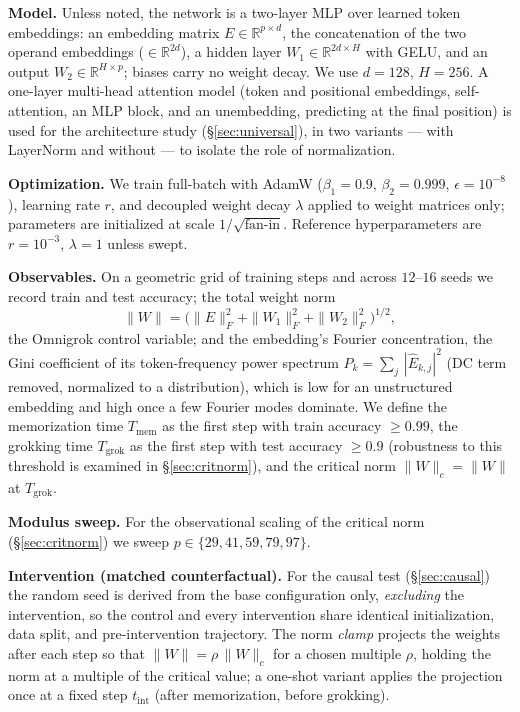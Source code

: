 \documentclass[10pt,twocolumn]{article}
\newcommand{\R}{\mathbb{R}}
\newcommand{\lam}{\lambda}
\newcommand{\Wc}{\|W\|_{c}}
\newcommand{\Tgrok}{T_{\mathrm{grok}}}
\begin{document}
\textbf{Model.} Unless noted, the network is a two-layer MLP over learned token embeddings: an embedding
matrix $E\in\R^{p\times d}$, the concatenation of the two operand embeddings ($\in\R^{2d}$), a hidden layer
$W_1\in\R^{2d\times H}$ with GELU, and an output $W_2\in\R^{H\times p}$; biases carry no weight decay. We
use $d=128$, $H=256$. A one-layer multi-head attention model (token and positional embeddings,
self-attention, an MLP block, and an unembedding, predicting at the final position) is used for the
architecture study (\S\ref{sec:universal}), in two variants --- with LayerNorm and without --- to isolate
the role of normalization.

\textbf{Optimization.} We train full-batch with AdamW ($\beta_1{=}0.9$, $\beta_2{=}0.999$,
$\epsilon{=}10^{-8}$), learning rate $r$, and decoupled weight decay $\lam$ applied to weight matrices only;
parameters are initialized at scale $1/\sqrt{\text{fan-in}}$. Reference hyperparameters are $r=10^{-3}$,
$\lam=1$ unless swept.

\textbf{Observables.} On a geometric grid of training steps and across $12$--$16$ seeds we record train and
test accuracy; the total weight norm
\begin{equation}
\|W\| = \big(\|E\|_F^2 + \|W_1\|_F^2 + \|W_2\|_F^2\big)^{1/2},
\end{equation}
the Omnigrok control variable; and the embedding's Fourier concentration, the Gini coefficient of its
token-frequency power spectrum $P_k=\sum_{j}\,|\hat{E}_{k,j}|^2$ (DC term removed, normalized to a
distribution), which is low for an unstructured embedding and high once a few Fourier modes dominate. We
define the memorization time $T_{\mathrm{mem}}$ as the first step with train accuracy $\ge 0.99$, the
grokking time $\Tgrok$ as the first step with test accuracy $\ge 0.9$ (robustness to this threshold is
examined in \S\ref{sec:critnorm}), and the critical norm $\Wc=\|W\|$ at $\Tgrok$.

\textbf{Modulus sweep.} For the observational scaling of the critical norm (\S\ref{sec:critnorm}) we sweep
$p\in\{29,41,59,79,97\}$.

\textbf{Intervention (matched counterfactual).} For the causal test (\S\ref{sec:causal}) the random seed is
derived from the base configuration only, \emph{excluding} the intervention, so the control and every
intervention share identical initialization, data split, and pre-intervention trajectory. The norm
\emph{clamp} projects the weights after each step so that $\|W\|=\rho\,\Wc$ for a chosen multiple $\rho$,
holding the norm at a multiple of the critical value; a one-shot variant applies the projection once at a
fixed step $t_{\mathrm{int}}$ (after memorization, before grokking).
\end{document}
